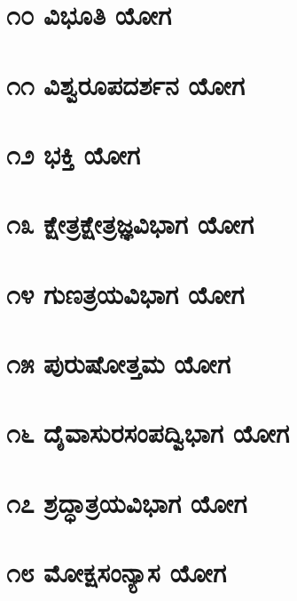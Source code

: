 \documentclass[12pt,twoside,openright,a5paper]{book}
\begin{document}
\chapter{\kanfont ೧೦ ವಿಭೂತಿ ಯೋಗ}
\chapter{\kanfont ೧೧ ವಿಶ್ವರೂಪದರ್ಶನ ಯೋಗ}
\chapter{\kanfont ೧೨ ಭಕ್ತಿ ಯೋಗ}
\chapter{\kanfont ೧೩ ಕ್ಷೇತ್ರಕ್ಷೇತ್ರಜ್ಞವಿಭಾಗ ಯೋಗ}
\chapter{\kanfont ೧೪ ಗುಣತ್ರಯವಿಭಾಗ ಯೋಗ}
\chapter{\kanfont ೧೫ ಪುರುಷೋತ್ತಮ ಯೋಗ}
\chapter{\kanfont ೧೬ ದೈವಾಸುರಸಂಪದ್ವಿಭಾಗ ಯೋಗ}
\chapter{\kanfont ೧೭ ಶ್ರದ್ಧಾತ್ರಯವಿಭಾಗ ಯೋಗ}
\chapter{\kanfont ೧೮ ಮೋಕ್ಷಸಂನ್ಯಾಸ ಯೋಗ}
\printindex
\end{document}
